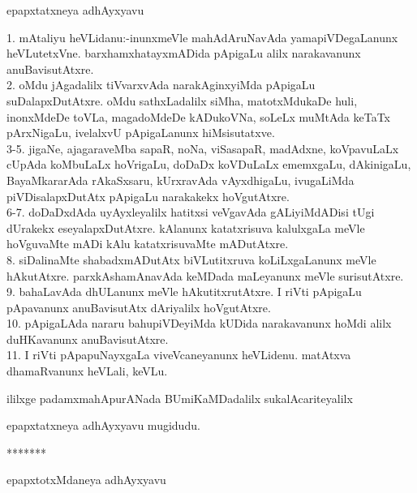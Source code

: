 \documentclass{article}
\begin{document}
\begin{center}
epapxtatxneya adhAyxyavu
\end{center}

1. mAtaliyu heVLidanu:-inunxmeVle mahAdAruNavAda yamapiVDegaLanunx heVLutetxVne. barxhamxhatayxmADida pApigaLu alilx narakavanunx anuBavisutAtxre.\\
2. oMdu jAgadalilx tiVvarxvAda narakAginxyiMda pApigaLu suDalapxDutAtxre. oMdu sathxLadalilx siMha, matotxMdukaDe huli, inonxMdeDe toVLa, magadoMdeDe kADukoVNa, soLeLx muMtAda keTaTx pArxNigaLu, ivelalxvU pApigaLanunx hiMsisutatxve.\\
3-5. jigaNe, ajagaraveMba sapaR, noNa, viSasapaR, madAdxne, koVpavuLaLx cUpAda koMbuLaLx hoVrigaLu, doDaDx koVDuLaLx ememxgaLu, dAkinigaLu, BayaMkararAda rAkaSxsaru, kUrxravAda vAyxdhigaLu, ivugaLiMda piVDisalapxDutAtx pApigaLu narakakekx hoVgutAtxre.\\
6-7. doDaDxdAda uyAyxleyalilx hatitxsi veVgavAda gALiyiMdADisi tUgi dUrakekx eseyalapxDutAtxre. kAlanunx katatxrisuva kalulxgaLa meVle hoVguvaMte mADi kAlu katatxrisuvaMte mADutAtxre.\\
8. siDalinaMte shabadxmADutAtx biVLutitxruva koLiLxgaLanunx meVle hAkutAtxre. parxkAshamAnavAda keMDada maLeyanunx meVle surisutAtxre.\\
9. bahaLavAda dhULanunx meVle hAkutitxrutAtxre. I riVti pApigaLu pApavanunx anuBavisutAtx dAriyalilx hoVgutAtxre.\\
10. pApigaLAda nararu bahupiVDeyiMda kUDida narakavanunx hoMdi alilx duHKavanunx anuBavisutAtxre.\\
11. I riVti pApapuNayxgaLa viveVcaneyanunx heVLidenu. matAtxva dhamaRvanunx heVLali, keVLu.\\

\begin{center}
ililxge padamxmahApurANada BUmiKaMDadalilx sukalAcariteyalilx
\end{center}

\begin{center}
epapxtatxneya adhAyxyavu mugidudu.
\end{center}

\begin{center}
*******
\end{center}

\begin{center}
epapxtotxMdaneya adhAyxyavu
\end{center}
\end{document}
